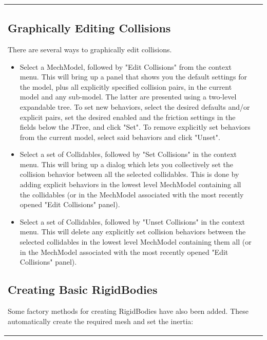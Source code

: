 \documentclass{article}
\begin{document}
\begin{tabular}{ll}
\begin{itemize}
\begin{itemize}
\end{itemize}

\end{itemize}

\subsection*{Graphically Editing Collisions}

There are several ways to graphically edit collisions.

\begin{itemize}

\item Select a MechModel, followed by {\sf "Edit Collisions"} from the context 
menu. This will bring up a panel that shows you the default settings 
for the model, plus all explicitly specified collision pairs, in the 
current model and any sub-model. The latter are presented using a
 two-level expandable tree. To set new behaviors, select the desired 
defaults and/or explicit pairs, set the desired enabled and the
friction settings in the fields below the JTree, and click {\sf "Set"}. 
To remove explicitly set behaviors from the current model, select said 
behaviors and click {\sf "Unset"}.

\item Select a set of Collidables, followed by {\sf "Set Collisions"} in the 
context menu. This will bring up a dialog which lets you collectively 
set the collision behavior between all the selected collidables. This 
is done by adding explicit behaviors in the lowest level MechModel 
containing all the collidables (or in the MechModel associated with
the most recently opened {\sf "Edit Collisions"} panel).

\item Select a set of Collidables, followed by {\sf "Unset Collisions"} in the 
context menu. This will delete any explicitly set collision behaviors 
between the selected collidables in the lowest level MechModel
containing them all (or in the MechModel associated with the most 
recently opened {\sf "Edit Collisions"} panel). 

\end{itemize}

\subsection*{Creating Basic RigidBodies}

Some factory methods for creating RigidBodies have also been added. 
These automatically create the required mesh and set the inertia:


\end{tabular}
\end{document}
